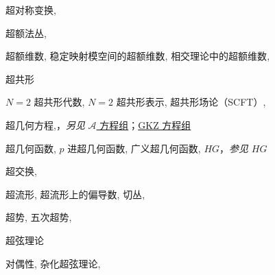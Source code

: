 \begin{theindex}
\subitem \leavevmode\hypertarget{idx:1312}{超对称变换},\enspace{}
\indexspace
\item \leavevmode\hypertarget{idx:0280}{超额法丛},\enspace{}
\indexspace
\item \leavevmode\hypertarget{idx:0277}{超额维数},\enspace{}
\subitem \leavevmode\hypertarget{idx:0278}{稳定映射模空间的超额维数},\enspace{}
\subitem \leavevmode\hypertarget{idx:0279}{相交理论中的超额维数},\enspace{}
\indexspace
\item \leavevmode\hypertarget{idx:1292}{超共形}
\subitem \leavevmode\hypertarget{idx:1293}{$N=2$ 超共形代数},\enspace{}
\subitem \leavevmode\hypertarget{idx:1294}{$N=2$ 超共形表示},\enspace{}
\subitem \leavevmode\hypertarget{idx:1295}{超共形场论（SCFT）},\enspace{}
\indexspace
\item \leavevmode\hypertarget{idx:0615}{超几何方程},\enspace{}，\textit{另见} \hyperlink{idx:0055}{$\mathcal A$ 方程组}；\hyperlink{idx:0449}{GKZ 方程组}
\indexspace
\item \leavevmode\hypertarget{idx:0616}{超几何函数},\enspace{}
\subitem \leavevmode\hypertarget{idx:0617}{$p$ 进超几何函数},\enspace{}
\subitem \leavevmode\hypertarget{idx:0618}{广义超几何函数},\enspace{}
\subitem \leavevmode\hypertarget{idx:0619}{$HG$}，\textit{参见} \hyperlink{idx:0579}{$HG$}
\indexspace
\item \leavevmode\hypertarget{idx:1291}{超交换},\enspace{}
\indexspace
\item \leavevmode\hypertarget{idx:1299}{超流形},\enspace{}
\subitem \leavevmode\hypertarget{idx:1300}{超流形上的偏导数},\enspace{}
\subitem \leavevmode\hypertarget{idx:1301}{切丛},\enspace{}
\indexspace
\item \leavevmode\hypertarget{idx:1302}{超势},\enspace{}
\subitem \leavevmode\hypertarget{idx:1303}{五次超势},\enspace{}
\indexspace
\item \leavevmode\hypertarget{idx:1304}{超弦理论}
\subitem \leavevmode\hypertarget{idx:1305}{对偶性},\enspace{}
\subitem \leavevmode\hypertarget{idx:1306}{杂化超弦理论},\enspace{}

\end{theindex}
